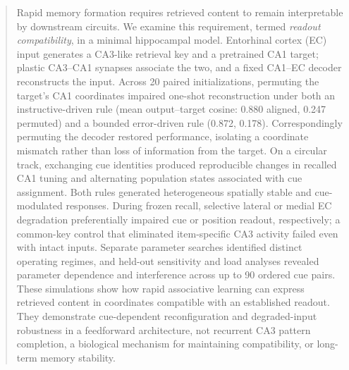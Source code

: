 \begin{abstract}
Rapid memory formation requires retrieved content to remain interpretable by
downstream circuits. We examine this requirement, termed \emph{readout
compatibility}, in a minimal hippocampal model. Entorhinal cortex (EC) input
generates a CA3-like retrieval key and a pretrained CA1 target; plastic
CA3--CA1 synapses associate the two, and a fixed CA1--EC decoder reconstructs
the input. Across 20 paired initializations, permuting the target's CA1
coordinates impaired one-shot reconstruction under both an instructive-driven
rule (mean output--target cosine: 0.880 aligned, 0.247 permuted) and a bounded
error-driven rule (0.872, 0.178). Correspondingly permuting the decoder
restored performance, isolating a coordinate mismatch rather than loss of
information from the target. On a circular track, exchanging cue identities
produced reproducible changes in recalled CA1 tuning and alternating
population states associated with cue assignment. Both rules generated
heterogeneous spatially stable and cue-modulated responses. During frozen
recall, selective lateral or medial EC degradation preferentially impaired
cue or position readout, respectively; a common-key control that eliminated
item-specific CA3 activity failed even with intact inputs. Separate parameter
searches identified distinct operating regimes, and held-out sensitivity and
load analyses revealed parameter dependence and interference across up to 90
ordered cue pairs. These simulations show how rapid associative learning can
express retrieved content in coordinates compatible with an established
readout. They demonstrate cue-dependent reconfiguration and degraded-input
robustness in a feedforward architecture, not recurrent CA3 pattern completion,
a biological mechanism for maintaining compatibility, or long-term memory
stability.
\end{abstract}
